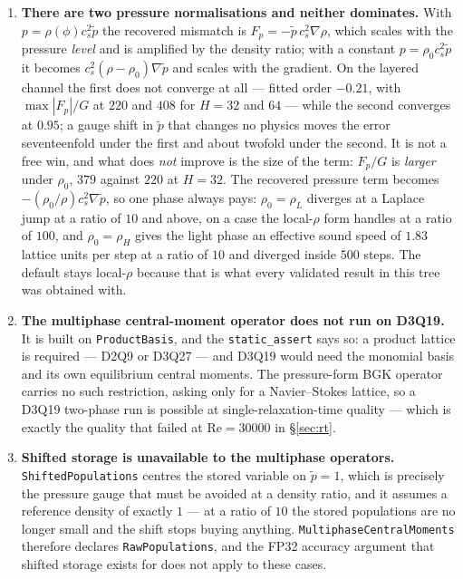 \documentclass[11pt,a4paper]{article}
\newcommand{\code}[1]{\texttt{\small #1}}
\newcommand{\cs}{c_s}
\begin{document}
\begin{enumerate}[leftmargin=1.4em,itemsep=4pt]
\item \textbf{There are two pressure normalisations and neither dominates.} With
  $p = \rho(\phi)\cs^2\tilde p$ the recovered mismatch is
  $F_p = -\tilde p\,\cs^2\nabla\rho$, which scales with the pressure
  \emph{level} and is amplified by the density ratio; with a constant
  $p = \rho_0\cs^2\tilde p$ it becomes $\cs^2(\rho-\rho_0)\nabla\tilde p$ and
  scales with the gradient. On the layered channel the first does not converge
  at all --- fitted order $-0.21$, with $\max|F_p|/G$ at $220$ and $408$ for
  $H = 32$ and $64$ --- while the second converges at $0.95$; a gauge shift in
  $\tilde p$ that changes no physics moves the error seventeenfold under the
  first and about twofold under the second. It is not a free win, and what does
  \emph{not} improve is the size of the term: $F_p/G$ is \emph{larger} under
  $\rho_0$, $379$ against $220$ at $H = 32$. The recovered pressure term becomes
  $-(\rho_0/\rho)\cs^2\nabla\tilde p$, so one phase always pays: $\rho_0=\rho_L$
  diverges at a Laplace jump at a ratio of $10$ and above, on a case the
  local-$\rho$ form handles at a ratio of $100$, and $\rho_0=\rho_H$ gives the
  light phase an effective sound speed of $1.83$ lattice units per step at a
  ratio of $10$ and diverged inside $500$ steps. The default stays local-$\rho$
  because that is what every validated result in this tree was obtained with.

\item \textbf{The multiphase central-moment operator does not run on D3Q19.}
  It is built on \code{ProductBasis}, and the \code{static\_assert} says so: a
  product lattice is required --- D2Q9 or D3Q27 --- and D3Q19 would need the
  monomial basis and its own equilibrium central moments. The pressure-form BGK
  operator carries no such restriction, asking only for a Navier--Stokes
  lattice, so a D3Q19 two-phase run is possible at single-relaxation-time
  quality --- which is exactly the quality that failed at $\mathrm{Re}=30000$ in
  \S\ref{sec:rt}.

\item \textbf{Shifted storage is unavailable to the multiphase operators.}
  \code{ShiftedPopulations} centres the stored variable on $\tilde p = 1$, which
  is precisely the pressure gauge that must be avoided at a density ratio, and
  it assumes a reference density of exactly $1$ --- at a ratio of $10$ the
  stored populations are no longer small and the shift stops buying anything.
  \code{MultiphaseCentralMoments} therefore declares \code{RawPopulations}, and
  the FP32 accuracy argument that shifted storage exists for does not apply to
  these cases.


\end{enumerate}
\end{document}
